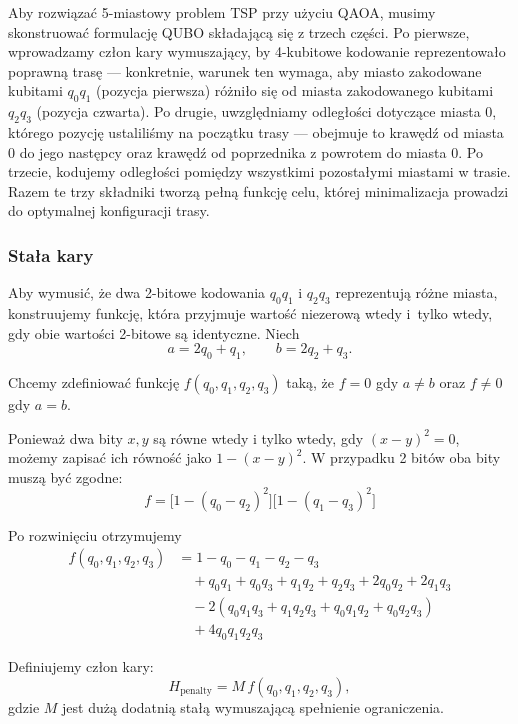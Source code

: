 Aby rozwiązać 5-miastowy problem TSP przy użyciu QAOA, musimy skonstruować formulację QUBO składającą się z trzech części. Po pierwsze, wprowadzamy człon kary wymuszający, by 4-kubitowe kodowanie reprezentowało poprawną trasę — konkretnie, warunek ten wymaga, aby miasto zakodowane kubitami $q_0q_1$ (pozycja pierwsza) różniło się od miasta zakodowanego kubitami $q_2q_3$ (pozycja czwarta). Po drugie, uwzględniamy odległości dotyczące miasta 0, którego pozycję ustaliliśmy na początku trasy — obejmuje to krawędź od miasta 0 do jego następcy oraz krawędź od poprzednika z powrotem do miasta 0. Po trzecie, kodujemy odległości pomiędzy wszystkimi pozostałymi miastami w trasie. Razem te trzy składniki tworzą pełną funkcję celu, której minimalizacja prowadzi do optymalnej konfiguracji trasy.

\subsubsection{Stała kary}

Aby wymusić, że dwa 2-bitowe kodowania $q_0q_1$ i $q_2q_3$ reprezentują różne miasta, konstruujemy funkcję, która przyjmuje wartość niezerową wtedy i~tylko wtedy, gdy obie wartości 2-bitowe są identyczne. Niech
\[
a = 2q_0 + q_1, \qquad b = 2q_2 + q_3.
\]

Chcemy zdefiniować funkcję $f(q_0,q_1,q_2,q_3)$ taką, że $f=0$ gdy $a \neq b$ oraz $f\neq 0$ gdy $a=b$.

Ponieważ dwa bity $x,y$ są równe wtedy i tylko wtedy, gdy $(x-y)^2=0$, możemy zapisać ich równość jako $1-(x-y)^2$. W przypadku 2 bitów oba bity muszą być zgodne:
\begin{equation}
f = \bigl[1 - (q_0 - q_2)^2\bigr]\bigl[1 - (q_1 - q_3)^2\bigr]
\end{equation}

Po rozwinięciu otrzymujemy
\begin{equation}
\begin{aligned}
f(q_0,q_1,q_2,q_3) &= 1 - q_0 - q_1 - q_2 - q_3 \\
&\quad + q_0q_1 + q_0q_3 + q_1q_2 + q_2q_3 + 2q_0q_2 + 2q_1q_3 \\
&\quad - 2(q_0q_1q_3 + q_1q_2q_3 + q_0q_1q_2 + q_0q_2q_3) \\
&\quad + 4q_0q_1q_2q_3
\end{aligned}
\end{equation}

Definiujemy człon kary:
\begin{equation}
H_{\text{penalty}} = M\,f(q_0,q_1,q_2,q_3),
\end{equation}
gdzie $M$ jest dużą dodatnią stałą wymuszającą spełnienie ograniczenia.

